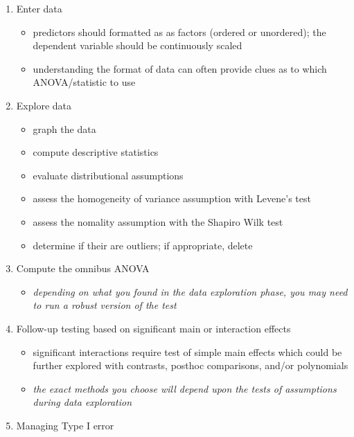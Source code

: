 \documentclass[
  11pt,
]{book}
\providecommand{\tightlist}{%
  \setlength{\itemsep}{0pt}\setlength{\parskip}{0pt}}
\begin{document}
\begin{enumerate}
\def\labelenumi{\arabic{enumi}.}
\tightlist
\item
  Enter data

  \begin{itemize}
  \tightlist
  \item
    predictors should formatted as as factors (ordered or unordered); the dependent variable should be continuously scaled
  \item
    understanding the format of data can often provide clues as to which ANOVA/statistic to use
  \end{itemize}
\item
  Explore data

  \begin{itemize}
  \tightlist
  \item
    graph the data
  \item
    compute descriptive statistics
  \item
    evaluate distributional assumptions
  \item
    assess the homogeneity of variance assumption with Levene's test\\
  \item
    assess the nomality assumption with the Shapiro Wilk test
  \item
    determine if their are outliers; if appropriate, delete
  \end{itemize}
\item
  Compute the omnibus ANOVA

  \begin{itemize}
  \tightlist
  \item
    \emph{depending on what you found in the data exploration phase, you may need to run a robust version of the test}
  \end{itemize}
\item
  Follow-up testing based on significant main or interaction effects

  \begin{itemize}
  \tightlist
  \item
    significant interactions require test of simple main effects which could be further explored with contrasts, posthoc comparisons, and/or polynomials
  \item
    \emph{the exact methods you choose will depend upon the tests of assumptions during data exploration}
  \end{itemize}
\item
  Managing Type I error
\end{enumerate}
\end{document}
